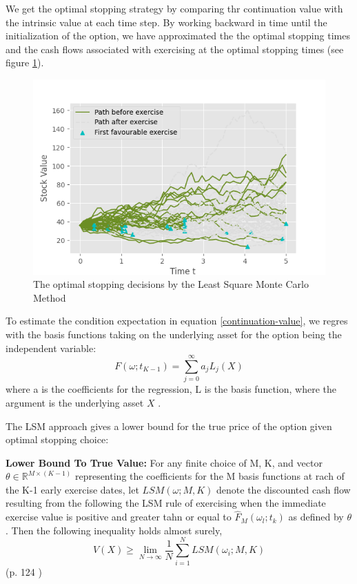 We get the optimal stopping strategy by comparing thr continuation value with the intrinsic value at each time step. By working backward in time until the initialization of the option, we have approximated the the optimal stopping times and the cash flows associated with exercising at the optimal stopping times (see figure \ref{fig:LSM2}). 

\begin{figure}[H]
\centering
\includegraphics{Figures/LSMFit2.png}
\decoRule
\caption[Optimal Stopping Decision]{The optimal stopping decisions by the Least Square Monte Carlo Method}
\label{fig:LSM2}
\end{figure}

To estimate the condition expectation in equation \ref{continuation-value}, we regres with the basis functions taking on the underlying asset for the option being the independent variable:
$$F(\omega;t_{K-1})= \sum_{j=0}^\infty a_j L_j(X)$$
where a is the coefficients for the regression, L is the basis function, where the argument is the underlying asset $X$ \parencite{lsm}.

The LSM approach gives a lower bound for the true price of the option given optimal stopping choice:
\theoremstyle{proposition}
\begin{proposition}{}\label{BS-price-EuroCall}
\textbf{Lower Bound To True Value:} For any finite choice of M, K, and vector $\theta\in \mathbb{R}^{M \times (K-1)}$ representing the coefficients for the M basis functions at rach of the K-1 early exercise dates, let $LSM(\omega;M,K)$ denote the discounted cash flow resulting from the following the LSM rule of exercising when the immediate exercise value is positive and greater tahn or equal to $\hat{F}_{M}(\omega_{l};t_{k})$ as defined by $\theta$. Then the following inequality holds almost surely,
$$V(X)\geq \lim_{N\to \infty} \dfrac{1}{N}\sum_{i=1}^{N} LSM(\omega_i;M,K)$$
(p. 124 \parencite{lsm})
\end{proposition}

